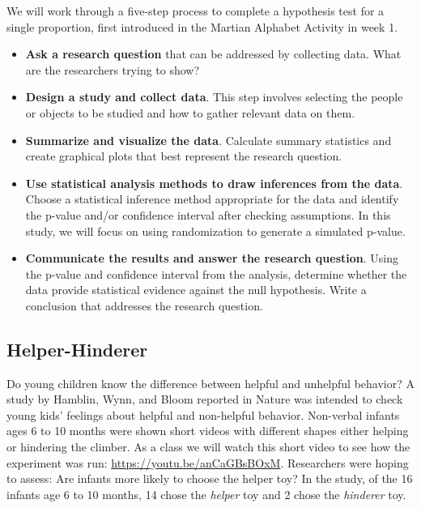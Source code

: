\documentclass[
]{report}
\begin{document}
We will work through a five-step process to complete a hypothesis test for a single proportion, first introduced in the Martian Alphabet Activity in week 1.

\begin{itemize}
\item
  \textbf{Ask a research question} that can be addressed by collecting data. What are the researchers trying to show?
\item
  \textbf{Design a study and collect data}. This step involves selecting the people or objects to be studied and how to gather relevant data on them.
\item
  \textbf{Summarize and visualize the data}. Calculate summary statistics and create graphical plots that best represent the research question.
\item
  \textbf{Use statistical analysis methods to draw inferences from the data}. Choose a statistical inference method appropriate for the data and identify the p-value and/or confidence interval after checking assumptions. In this study, we will focus on using randomization to generate a simulated p-value.
\item
  \textbf{Communicate the results and answer the research question}. Using the p-value and confidence interval from the analysis, determine whether the data provide statistical evidence against the null hypothesis. Write a conclusion that addresses the research question.
\end{itemize}

\newpage

\hypertarget{helper-hinderer}{%
\subsection{Helper-Hinderer}\label{helper-hinderer}}

Do young children know the difference between helpful and unhelpful behavior? A study by Hamblin, Wynn, and Bloom reported in Nature was intended to check young kids' feelings about helpful and non-helpful behavior. Non-verbal infants ages 6 to 10 months were shown short videos with different shapes either helping or hindering the climber. As a class we will watch this short video to see how the experiment was run: \url{https://youtu.be/anCaGBsBOxM}. Researchers were hoping to assess: Are infants more likely to choose the helper toy? In the study, of the 16 infants age 6 to 10 months, 14 chose the \emph{helper} toy and 2 chose the \emph{hinderer} toy.
\end{document}
